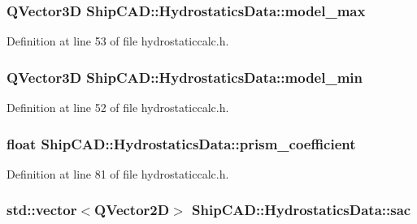 \hypertarget{structShipCAD_1_1HydrostaticsData_a9319fb2ad054a595b6e3b3fd4059a3ae}{
\subsubsection[{model\-\_\-max}]{\setlength{\rightskip}{0pt plus 5cm}Q\-Vector3\-D Ship\-C\-A\-D\-::\-Hydrostatics\-Data\-::model\-\_\-max}}\label{structShipCAD_1_1HydrostaticsData_a9319fb2ad054a595b6e3b3fd4059a3ae}


Definition at line 53 of file hydrostaticcalc.\-h.

\hypertarget{structShipCAD_1_1HydrostaticsData_acd93669bc08fa097974d41fbaf4dc81f}{
\subsubsection[{model\-\_\-min}]{\setlength{\rightskip}{0pt plus 5cm}Q\-Vector3\-D Ship\-C\-A\-D\-::\-Hydrostatics\-Data\-::model\-\_\-min}}\label{structShipCAD_1_1HydrostaticsData_acd93669bc08fa097974d41fbaf4dc81f}


Definition at line 52 of file hydrostaticcalc.\-h.

\hypertarget{structShipCAD_1_1HydrostaticsData_acabee310fcde293fcb0d9a5fd5effe27}{
\subsubsection[{prism\-\_\-coefficient}]{\setlength{\rightskip}{0pt plus 5cm}float Ship\-C\-A\-D\-::\-Hydrostatics\-Data\-::prism\-\_\-coefficient}}\label{structShipCAD_1_1HydrostaticsData_acabee310fcde293fcb0d9a5fd5effe27}


Definition at line 81 of file hydrostaticcalc.\-h.

\hypertarget{structShipCAD_1_1HydrostaticsData_a503a1f2299db9d5ae923e598b8ee31ba}{
\subsubsection[{sac}]{\setlength{\rightskip}{0pt plus 5cm}std\-::vector$<$Q\-Vector2\-D$>$ Ship\-C\-A\-D\-::\-Hydrostatics\-Data\-::sac}}\label{structShipCAD_1_1HydrostaticsData_a503a1f2299db9d5ae923e598b8ee31ba}


